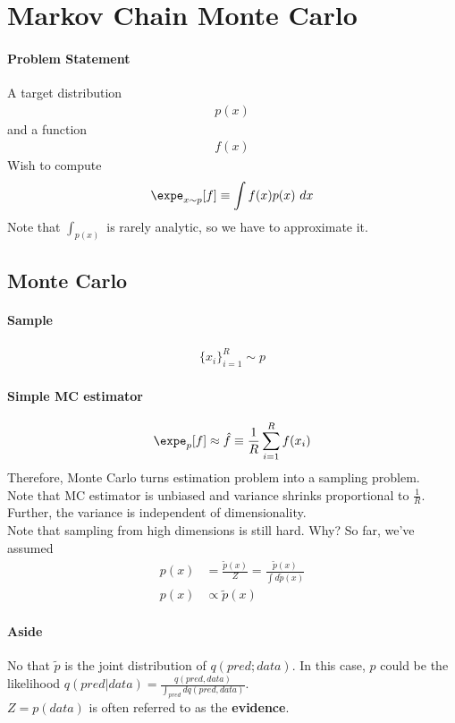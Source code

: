 \documentclass{article}
\begin{document}
	\section{Markov Chain Monte Carlo}
	\paragraph{Problem Statement} A target distribution
	\begin{align}
		p(x)
	\end{align}
	and a function
	\begin{align}
		f(x)
	\end{align}
	Wish to compute
	\begin{align}
		\expe_{x \sim p} [f] \equiv \int f(x) p(x)\ dx
	\end{align}
	Note that $\int_{p(x)}$ is rarely analytic, so we have to approximate it.
	\subsection{Monte Carlo}
	\paragraph{Sample}
	\begin{align}
		\{x_i\}_{i=1}^R \sim p
	\end{align}
	\paragraph{Simple MC estimator}
	\begin{align}
		\expe_p[f] \approx \hat{f} \equiv \frac{1}{R} \sum_{i=1}^R f(x_i)
	\end{align}
	Therefore, Monte Carlo turns estimation problem into a sampling problem. \\
	Note that MC estimator is unbiased and variance shrinks proportional to $\frac{1}{R}$. \\
	Further, the variance is independent of dimensionality. \\
	Note that sampling from high dimensions is still hard. Why? So far, we've assumed 
	\begin{align}
		p(x) &= \frac{\tilde{p}(x)}{Z} = \frac{\tilde{p}(x)}{\int d\tilde{p}(x)} \\
		p(x) &\propto \tilde{p}(x)
	\end{align}
	\paragraph{Aside} No that $\tilde{p}$ is the joint distribution of $q(pred; data)$. In this case, $p$ could be the likelihood $q(pred|data) = \frac{q(pred, data)}{\int_{pred}dq(pred, data)}$.\\
	$Z = p(data)$ is often referred to as the \textbf{evidence}.
\end{document}
